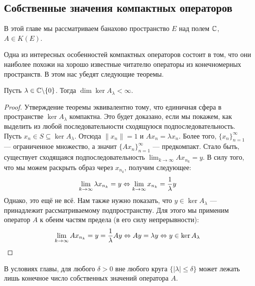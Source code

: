 \subsection*{Собственные значения компактных операторов}

\begin{note}
	В этой главе мы рассматриваем банахово пространство $E$ над полем $\mathbb{C}$, $A \in K(E)$.
\end{note}

\begin{note}
	Одна из интересных особенностей компактных операторов состоит в том, что они наиболее похожи на хорошо известные читателю операторы из конечномерных пространств. В этом нас убедят следующие теоремы.
\end{note}

\begin{theorem} \label{compact_finite_dim}
	Пусть $\lambda \in \mathbb{C} \backslash \{0\}$. Тогда $\dim \ker A_\lambda < \infty$.
\end{theorem}

\begin{proof}
	Утверждение теоремы эквивалентно тому, что единичная сфера в пространстве $\ker A_\lambda$ компактна. Это будет доказано, если мы покажем, как выделить из любой последовательности сходящуюся подпоследовательность. Пусть $x_n \in S \subseteq \ker A_\lambda$. Отсюда $\|x_n\| = 1$ и $Ax_n = \lambda x_n$. Более того, $\{x_n\}_{n = 1}^\infty$ --- ограниченное множество, а значит $\{Ax_n\}_{n = 1}^\infty$ --- предкомпакт. Стало быть, существует сходящаяся подпоследовательность $\lim_{k \to \infty} Ax_{n_k} = y$. В силу того, что мы можем раскрыть образ через $x_{n_k}$, получим следующее:
	\[
		\lim_{k \to \infty} \lambda x_{n_k} = y \Leftrightarrow \lim_{k \to \infty} x_{n_k} = \frac{1}{\lambda}y
	\]
	Однако, это ещё не всё. Нам также нужно показать, что $y \in \ker A_\lambda$ --- принадлежит рассматриваемому подпространству. Для этого мы применим оператор $A$ к обеим частям предела (в его силу непрерывности):
	\[
		\lim_{k \to \infty} Ax_{n_k} = y = \frac{1}{\lambda} Ay \Leftrightarrow Ay = \lambda y \Leftrightarrow y \in \ker A_\lambda
	\]
\end{proof}

\begin{theorem}
	В условиях главы, для любого $\delta > 0$ вне любого круга $\{|\lambda| \le \delta\}$ может лежать лишь конечное число собственных значений оператора $A$.
\end{theorem}

